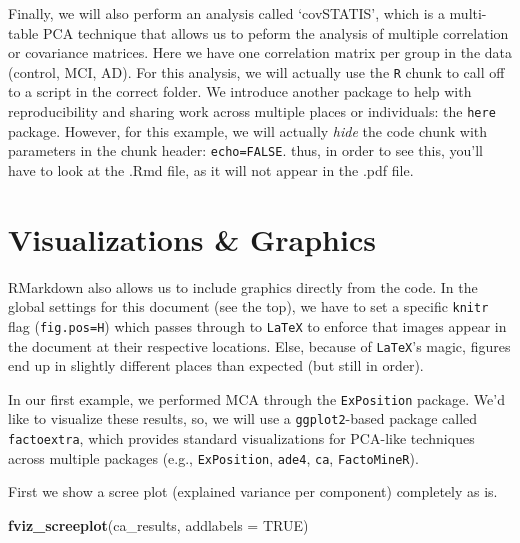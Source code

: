 \documentclass[]{article}
\newenvironment{Shaded}{\begin{snugshade}}{\end{snugshade}}
\newcommand{\DataTypeTok}[1]{\textcolor[rgb]{0.13,0.29,0.53}{#1}}
\newcommand{\KeywordTok}[1]{\textcolor[rgb]{0.13,0.29,0.53}{\textbf{#1}}}
\newcommand{\NormalTok}[1]{#1}
\newcommand{\OtherTok}[1]{\textcolor[rgb]{0.56,0.35,0.01}{#1}}
\begin{document}
Finally, we will also perform an analysis called `covSTATIS', which is a
multi-table PCA technique that allows us to peform the analysis of
multiple correlation or covariance matrices. Here we have one
correlation matrix per group in the data (control, MCI, AD). For this
analysis, we will actually use the \texttt{R} chunk to call off to a
script in the correct folder. We introduce another package to help with
reproducibility and sharing work across multiple places or individuals:
the \texttt{here} package. However, for this example, we will actually
\emph{hide} the code chunk with parameters in the chunk header:
\texttt{echo=FALSE}. thus, in order to see this, you'll have to look at
the .Rmd file, as it will not appear in the .pdf file.

\hypertarget{visualizations-graphics}{%
\section{Visualizations \& Graphics}\label{visualizations-graphics}}

RMarkdown also allows us to include graphics directly from the code. In
the global settings for this document (see the top), we have to set a
specific \texttt{knitr} flag
(\texttt{fig.pos=\textquotesingle{}H\textquotesingle{}}) which passes
through to \texttt{LaTeX} to enforce that images appear in the document
at their respective locations. Else, because of \texttt{LaTeX}'s magic,
figures end up in slightly different places than expected (but still in
order).

In our first example, we performed MCA through the \texttt{ExPosition}
package. We'd like to visualize these results, so, we will use a
\texttt{ggplot2}-based package called \texttt{factoextra}, which
provides standard visualizations for PCA-like techniques across multiple
packages (e.g., \texttt{ExPosition}, \texttt{ade4}, \texttt{ca},
\texttt{FactoMineR}).

First we show a scree plot (explained variance per component) completely
as is.

\begin{Shaded}
\begin{Highlighting}[]
\KeywordTok{fviz_screeplot}\NormalTok{(ca_results, }\DataTypeTok{addlabels =} \OtherTok{TRUE}\NormalTok{)}
\end{Highlighting}
\end{Shaded}
\end{document}
